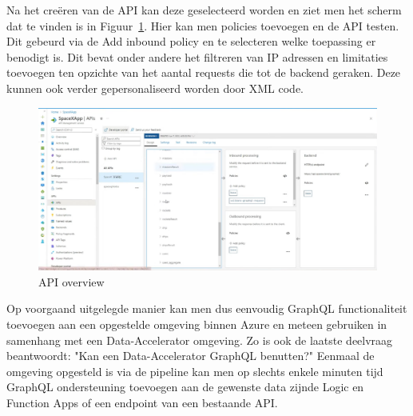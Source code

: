 Na het creëren van de API kan deze geselecteerd worden en ziet men het scherm dat te vinden is in Figuur~\ref{fig:API}. Hier kan men policies toevoegen en de API testen. Dit gebeurd via de Add inbound policy en te selecteren welke toepassing er benodigt is. Dit bevat onder andere het filtreren van IP adressen en limitaties toevoegen ten opzichte van het aantal requests die tot de backend geraken. Deze kunnen ook verder gepersonaliseerd worden door XML code.

\begin{figure}
    \centering
    \includegraphics[scale=0.30]{../img/API.png}
    \caption{\label{fig:API}API overview}
\end{figure}

Op voorgaand uitgelegde manier kan men dus eenvoudig GraphQL functionaliteit toevoegen aan een opgestelde omgeving binnen Azure en meteen gebruiken in samenhang met een Data-Accelerator omgeving. Zo is ook de laatste deelvraag beantwoordt: "Kan een Data-Accelerator GraphQL benutten?" Eenmaal de omgeving opgesteld is via de pipeline kan men op slechts enkele minuten tijd GraphQL ondersteuning toevoegen aan de gewenste data zijnde Logic en Function Apps of een endpoint van een bestaande API.




